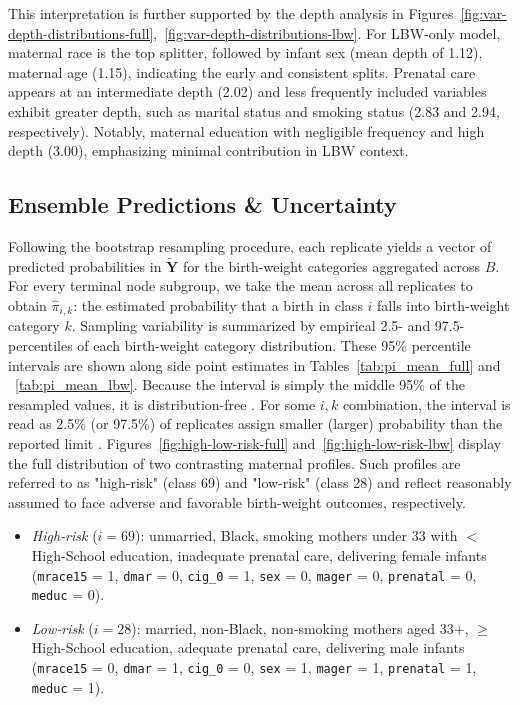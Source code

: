 This interpretation is further supported by the depth analysis in Figures~\ref{fig:var-depth-distributions-full},~\ref{fig:var-depth-distributions-lbw}. For LBW-only model, maternal race is the top splitter, followed by infant sex (mean depth of 1.12), maternal age (1.15), indicating the early and consistent splits. Prenatal care appears at an intermediate depth (2.02) and less frequently included variables exhibit greater depth, such as marital status and smoking status (2.83 and 2.94, respectively). Notably, maternal education with negligible frequency and high depth (3.00), emphasizing minimal contribution in LBW context. 


\subsection{Ensemble Predictions \& Uncertainty}
\label{sec:ch3-boot-pred}

Following the bootstrap resampling procedure, each replicate yields a vector of predicted probabilities in \(\tilde{\mathbf{Y}}\) for the birth-weight categories aggregated across \(B\). For every terminal node subgroup, we take the mean across all replicates to obtain \(\hat{\pi}_{i,k}\): the estimated probability that a birth in class \(i\) falls into birth-weight category \(k\). Sampling variability is summarized by empirical 2.5- and 97.5-percentiles of each birth-weight category distribution. These 95\% percentile intervals are shown along side point estimates in Tables~\ref{tab:pi_mean_full} and ~\ref{tab:pi_mean_lbw}. Because the interval is simply the middle 95\% of the resampled values, it is distribution-free \citep{percentile-interval}.  For some \(i,k\) combination, the interval is read as 2.5\% (or 97.5\%) of replicates assign smaller (larger) probability than the reported limit \citep{percentile-interval}. Figures~\ref{fig:high-low-risk-full} and~\ref{fig:high-low-risk-lbw} display the full distribution of two contrasting maternal profiles.  Such profiles are referred to as "high-risk" (class 69) and "low-risk" (class 28) and reflect reasonably assumed to face adverse and favorable birth-weight outcomes, respectively.

\begin{itemize}
  \item \emph{High‑risk} (\(i=69\)): unmarried, Black, smoking mothers under 33 with $<$ High-School education, inadequate prenatal care, delivering female infants (\texttt{mrace15} = 1, \texttt{dmar} = 0, \texttt{cig\_0} = 1, \texttt{sex} = 0, \texttt{mager} = 0, \texttt{prenatal} = 0, \texttt{meduc} = 0).
  \item \emph{Low‑risk} (\(i=28\)): married, non‑Black, non‑smoking mothers aged 33+, $\geq$ High-School education, adequate prenatal care, delivering male infants (\texttt{mrace15} = 0, \texttt{dmar} = 1, \texttt{cig\_0} = 0, \texttt{sex} = 1, \texttt{mager} = 1, \texttt{prenatal} = 1, \texttt{meduc} = 1).
\end{itemize}

